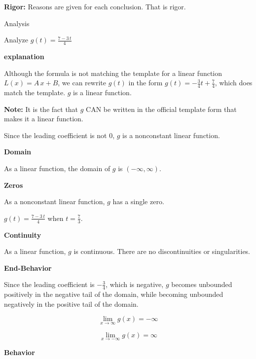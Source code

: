 \documentclass{ximera}
\begin{document}
\textbf{Rigor:} Reasons are given for each conclusion. That is rigor. 













\begin{example} Analysis

Analyze $g(t) = \frac{7 - 3 \, t}{4}$  


\textbf{\textcolor{red!75!green}{explanation}} 



Although the formula is not matching the template for a linear function $L(x) = A \, x + B$, we can rewrite $g(t)$ in the form $g(t) = -\frac{3}{4} t + \frac{7}{4}$, which does match the template. $g$ is a linear function.


\textbf{Note:} It is the fact that $g$ CAN be written in the official template form that makes it a linear function. 



Since the leading coefficient is not $0$, $g$ is a nonconstant linear function.



\textbf{Domain} 

As a linear function, the domain of $g$ is $(-\infty, \infty)$.


\textbf{Zeros} 

As a nonconstant linear function, $g$ has a single zero.

$g(t) = \frac{7 - 3 \, t}{4}$ when $t = \frac{7}{3}$. 


\textbf{Continuity} 

As a linear function, $g$ is continuous.  There are no discontinuities or singularities. 



\textbf{End-Behavior} 

Since the leading coefficient is $-\frac{3}{4}$, which is negative, $g$ becomes unbounded positively in the negative tail of the domain, while becoming unbounded negatively in the positive tail of the domain.



\[
\lim\limits_{x \to \infty} g(x) = -\infty
\]

\[
\lim\limits_{x \to -\infty} g(x) = \infty
\]





\textbf{Behavior} 


\end{example}
\end{document}
